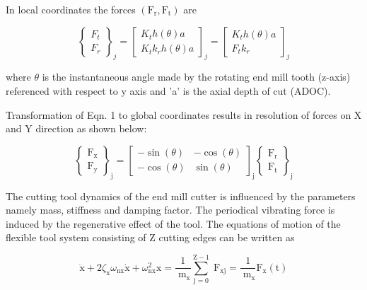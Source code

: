 \documentclass[10pt]{article}
\begin{document}
In local coordinates the forces \(\left( {{\mathrm{F}}_{\mathrm{r}},{\mathrm{F}}_{\mathrm{t}}}\right)\) are

\[
{\left\{  \begin{array}{l} {F}_{t} \\  {F}_{r} \end{array}\right\}  }_{j} = {\left\lbrack  \begin{matrix} {K}_{t}h\left( \theta \right) a \\  {K}_{t}{k}_{r}h\left( \theta \right) a \end{matrix}\right\rbrack  }_{j} = {\left\lbrack  \begin{matrix} {K}_{t}h\left( \theta \right) a \\  {F}_{t}{k}_{r} \end{matrix}\right\rbrack  }_{j} \tag{1}
\]

where \(\theta\) is the instantaneous angle made by the rotating end mill tooth (z-axis) referenced with respect to y axis and 'a' is the axial depth of cut (ADOC).

Transformation of Eqn. 1 to global coordinates results in resolution of forces on X and Y direction as shown below:

\[
{\left\{  \begin{array}{l} {\mathrm{F}}_{\mathrm{x}} \\  {\mathrm{F}}_{\mathrm{y}} \end{array}\right\}  }_{\mathrm{j}} = {\left\lbrack  \begin{matrix}  - \sin \left( \theta \right) &  - \cos \left( \theta \right) \\   - \cos \left( \theta \right) & \sin \left( \theta \right)  \end{matrix}\right\rbrack  }_{\mathrm{j}}{\left\{  \begin{array}{l} {\mathrm{F}}_{\mathrm{r}} \\  {\mathrm{F}}_{\mathrm{t}} \end{array}\right\}  }_{\mathrm{j}} \tag{2}
\]

The cutting tool dynamics of the end mill cutter is influenced by the parameters namely mass, stiffness and damping factor. The periodical vibrating force is induced by the regenerative effect of the tool. The equations of motion of the flexible tool system consisting of \(\mathrm{Z}\) cutting edges can be written as

\[
\ddot{\mathrm{x}} + 2{\zeta }_{\mathrm{x}}{\omega }_{\mathrm{{nx}}}\dot{\mathrm{x}} + {\omega }_{\mathrm{{nx}}}^{2}\mathrm{x} = \frac{1}{{\mathrm{\;m}}_{\mathrm{x}}}\mathop{\sum }\limits_{{\mathrm{j} = 0}}^{{\mathrm{Z} - 1}}{\mathrm{\;F}}_{\mathrm{{xj}}} = \frac{1}{{\mathrm{\;m}}_{\mathrm{x}}}{\mathrm{F}}_{\mathrm{x}}\left( \mathrm{t}\right)  \tag{3}
\]
\end{document}
